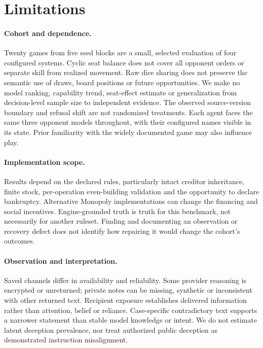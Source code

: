 \section{Limitations}
\label{sec:limitations}

\paragraph{Cohort and dependence.}
Twenty games from five seed blocks are a small, selected evaluation of four configured systems. Cyclic seat balance does not cover all opponent orders or separate skill from realized movement. Raw dice sharing does not preserve the semantic use of draws, board positions or future opportunities. We make no model ranking, capability trend, seat-effect estimate or generalization from decision-level sample size to independent evidence. The observed source-version boundary and refusal shift are not randomized treatments. Each agent faces the same three opponent models throughout, with their configured names visible in its state. Prior familiarity with the widely documented game may also influence play.

\paragraph{Implementation scope.}
Results depend on the declared rules, particularly intact creditor inheritance, finite stock, per-operation even-building validation and the opportunity to declare bankruptcy. Alternative Monopoly implementations can change the financing and social incentives. Engine-grounded truth is truth for this benchmark, not necessarily for another ruleset. Finding and documenting an observation or recovery defect does not identify how repairing it would change the cohort's outcomes.

\paragraph{Observation and interpretation.}
Saved channels differ in availability and reliability. Some provider reasoning is encrypted or unreturned; private notes can be missing, synthetic or inconsistent with other returned text. Recipient exposure establishes delivered information rather than attention, belief or reliance. Case-specific contradictory text supports a narrower statement than stable model knowledge or intent. We do not estimate latent deception prevalence, nor treat authorized public deception as demonstrated instruction misalignment.

